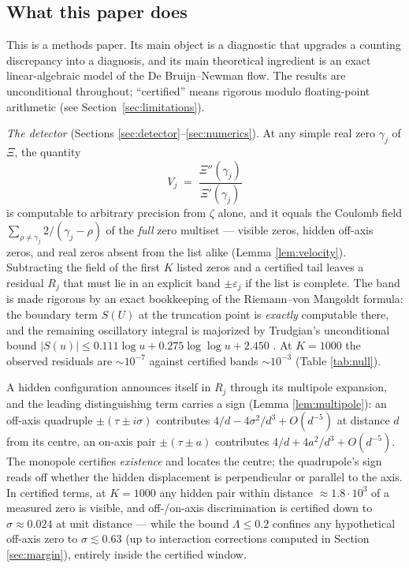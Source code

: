 \documentclass[11pt]{amsart}
\theoremstyle{remark}
\begin{document}
\subsection{What this paper does}
This is a methods paper. Its main object is a diagnostic that upgrades a counting discrepancy into a diagnosis, and its main theoretical ingredient is an exact linear-algebraic model of the De Bruijn--Newman flow. The results are unconditional throughout; ``certified'' means rigorous modulo floating-point arithmetic (see Section~\ref{sec:limitations}).

\emph{The detector} (Sections \ref{sec:detector}--\ref{sec:numerics}). At any simple real zero $\gamma_j$ of $\Xi$, the quantity
\[
V_j \;=\; \frac{\Xi''(\gamma_j)}{\Xi'(\gamma_j)}
\]
is computable to arbitrary precision from $\zeta$ alone, and it equals the Coulomb field $\sum_{\rho\ne\gamma_j} 2/(\gamma_j-\rho)$ of the \emph{full} zero multiset --- visible zeros, hidden off-axis zeros, and real zeros absent from the list alike (Lemma \ref{lem:velocity}). Subtracting the field of the first $K$ listed zeros and a certified tail leaves a residual $R_j$ that must lie in an explicit band $\pm\varepsilon_j$ if the list is complete. The band is made rigorous by an exact bookkeeping of the Riemann--von Mangoldt formula: the boundary term $S(U)$ at the truncation point is \emph{exactly} computable there, and the remaining oscillatory integral is majorized by Trudgian's unconditional bound $|S(u)|\le 0.111\log u+0.275\log\log u+2.450$ \cite{Trudgian}. At $K=1000$ the observed residuals are $\sim 10^{-7}$ against certified bands $\sim 10^{-3}$ (Table \ref{tab:null}).

A hidden configuration announces itself in $R_j$ through its multipole expansion, and the leading distinguishing term carries a sign (Lemma \ref{lem:multipole}): an off-axis quadruple $\pm(\tau\pm i\sigma)$ contributes $4/d - 4\sigma^2/d^3+O(d^{-5})$ at distance $d$ from its centre, an on-axis pair $\pm(\tau\pm a)$ contributes $4/d + 4a^2/d^3+O(d^{-5})$. The monopole certifies \emph{existence} and locates the centre; the quadrupole's sign reads off whether the hidden displacement is perpendicular or parallel to the axis. In certified terms, at $K=1000$ any hidden pair within distance $\approx 1.8\cdot 10^{3}$ of a measured zero is visible, and off-/on-axis discrimination is certified down to $\sigma\approx 0.024$ at unit distance --- while the bound $\Lambda\le 0.2$ confines any hypothetical off-axis zero to $\sigma\lesssim 0.63$ (up to interaction corrections computed in Section \ref{sec:margin}), entirely inside the certified window.
\end{document}
